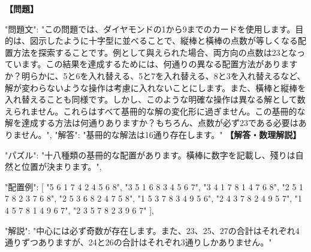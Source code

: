 \documentclass[10pt,a4paper,oneside,openany]{ltjsbook}
\begin{document}
\begin{tcolorbox}[colback=softblue,colframe=primaryblue,title=\textbf{第 382 問：THE CROSS OF CARDS.},arc=2mm,boxrule=1pt,breakable]
\textbf{【問題】}\par\vspace{0.3em}
{
"問題文": "この問題では、ダイヤモンドの1から9までのカードを使用します。目的は、図示したように十字型に並べることで、縦棒と橫棒の点数が等しくなる配置方法を探索することです。例として與えられた場合、両方向の点数は23となっています。この結果を達成するためには、何通りの異なる配置方法がありますか？明らかに、5と6を入れ替える、5と7を入れ替える、8と3を入れ替えるなど、解が変わらないような操作は考慮に入れないことにします。また、橫棒と縦棒を入れ替えることも同様です。しかし、このような明確な操作は異なる解として数えられません。これらはすべて基冊的な解の変化形に過ぎません。この基冊的な解を達成する方法は何通りありますか？もちろん、点数が必ず23である必要はありません。",
"解答": "基冊的な解法は16通り存在します。"
}
\tcblower
\textbf{【解答・数理解説】}\par\vspace{0.3em}
{
  "パズル": "十八種類の基冊的な配置があります。橫棒に数字を記載し、殘りは自然と位置が決まります。",
  
  "配置例": [
    "5 6 1 7 4   2 4 5 6 8",
    "3 5 1 6 8   3 4 5 6 7",
    "3 4 1 7 8   1 4 7 6 8",
    "2 5 1 7 8   2 3 7 6 8",
    "2 5 3 6 8   2 4 7 5 8",
    "1 5 3 7 8   3 4 9 5 6",
    "2 4 3 7 8   2 4 9 5 7",
    "1 4 5 7 8   1 4 9 6 7",
    "2 3 5 7 8   2 3 9 6 7"
  ],
  
  "解説": "中心には必ず奇数が存在します。また、23、25、27の合計はそれぞれ4通りずつありますが、24と26の合計はそれぞれ3通りしかありません。"
}
\end{tcolorbox}
\end{document}
